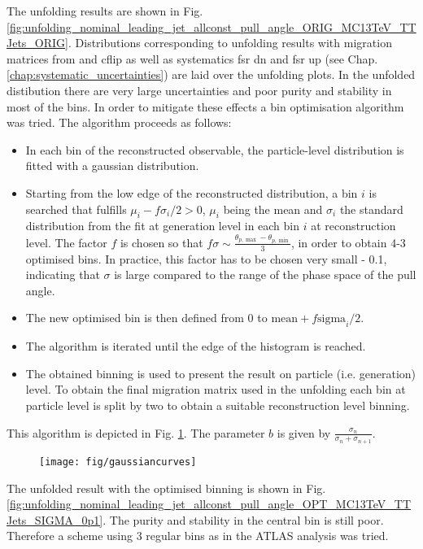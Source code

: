 The unfolding results are shown in Fig. \ref{fig:unfolding_nominal_leading_jet_allconst_pull_angle_ORIG_MC13TeV_TTJets_ORIG}. Distributions corresponding to unfolding results with migration matrices from \ttbar \HERWIGpp and \ttbar cflip as well as systematics \ttbar fsr dn and \ttbar fsr up (see Chap. \ref{chap:systematic_uncertainties}) are laid over the unfolding plots. In the unfolded distibution there are very large uncertainties and poor purity and stability in most of the bins. In order to mitigate these effects a bin optimisation algorithm was tried. The algorithm proceeds as follows:

\begin{itemize}
\item In each bin of the reconstructed observable, the particle-level distribution is fitted with a gaussian distribution.
\item Starting from the low edge of the reconstructed distribution, a bin $i$ is searched that fulfills $\mu_{i}-f\sigma_{i}/2 > 0$, $\mu_{i}$ being the mean and $\sigma_{i}$ the standard distribution from the fit at generation level in each bin $i$ at reconstruction level. The factor $f$ is chosen so that $f\sigma\sim\frac{\theta_{p,\max}-\theta_{p, \min}}{3}$, in order to obtain 4-3 optimised bins. In practice, this factor has to be chosen very small - 0.1, indicating that $\sigma$ is large compared to the range of the phase space of the pull angle.
\item The new optimised bin is then defined from 0 to $\text{mean}+f\text{sigma}_{i}/2$. 
\item The algorithm is iterated until the edge of the histogram is reached.
\item The obtained binning is used to present the result on particle (i.e. generation) level. To obtain the final migration matrix used in the unfolding each bin at particle level is split by two to obtain a suitable reconstruction level binning.
\end{itemize}

This algorithm is depicted in Fig. \ref{fig:gaussiancurves}. The parameter $b$ is given by $\frac{\sigma_{n}}{\sigma_{n} + \sigma_{n+1}}$.

\begin{figure}
  \centering
  \texttt{[image: fig/gaussiancurves]}
  \caption{}
  \label{fig:gaussiancurves}
\end{figure}

The unfolded result with the optimised binning is shown in Fig. \ref{fig:unfolding_nominal_leading_jet_allconst_pull_angle_OPT_MC13TeV_TTJets_SIGMA_0p1}. The purity and stability in the central bin is still poor. Therefore a scheme using 3 regular bins as in the ATLAS analysis \cite{ATLAS:2017iaz} was tried.

